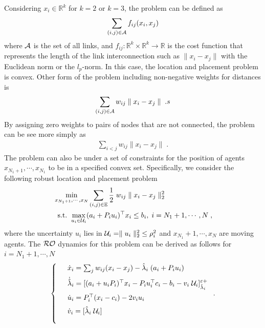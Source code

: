 \documentclass[journal,twoside,web]{ieeecolor}
\begin{document}
Considering $x_i \in \mathbb{R}^k$ for $k=2$ or $k=3$, the problem can be defined as
\begin{align*}
    \sum_{(i,j) \in {\cal A}} f_{ij}(x_i,x_j)
\end{align*}
where ${\cal A}$ is the set of all links, and $f_{ij}:\mathbb{R}^k \times \mathbb{R}^k \rightarrow \mathbb{R}$ is the cost function that represents the length of the link interconnection such as $\parallel x_i-x_j \parallel$ with the Euclidean norm or the $l_p$-norm. In this case, the location and placement problem is convex. Other form of the problem including non-negative weights for distances is
\begin{align*}
    \sum_{(i,j) \in {\cal A}} w_{ij} \parallel x_i - x_j \parallel\;.
s\end{align*}
By assigning zero weights to pairs of nodes that are not connected, the problem can be see more simply as
\begin{align*}
    \sum_{i<j} w_{ij} \parallel x_i - x_j \parallel\;.
\end{align*}
\fi
The problem can also be under a set of constraints for the position of agents $x_{N_1+1},\cdots,x_{N_1}$ to be in a specified convex set. Specifically, we consider the following robust location and placement problem
\begin{align*}
    &\min_{x_{N_1+1},\cdots,x_N} \sum_{(i,j)\in {\mathbb E}} \frac{1}{2}\; w_{ij} \parallel x_i - x_j \parallel_2^2\\
    &\;\;\text{s.t.}\;\;\underset{u_i\in {\cal U}_i}{\max} (a_i+P_i u_i)^\top x_i \leq b_i, \; i={N_1+1},\cdots,N\;,
\end{align*}
where the uncertainty $u_i$ lies in ${\cal U}_i = \parallel u_i \parallel_2^2\; \leq \rho_i^2$ and $x_{N_1}+1,\cdots,x_{N}$ are moving agents. The ${\cal RO}$ dynamics for this problem can be derived as follows for $i=N_1+1,\cdots,N$
\begin{align*}
\left\{
\begin{array}{cl}
\vspace{2mm}
&\dot{x}_i=\sum_j w_{ij} (x_i-x_j)-\hat \lambda_i \; (a_i+P_i u_i)\\
\vspace{2mm}
&\dot{\hat \lambda}_i=[(a_i+u_i P_i)^\top x_i-P_i u_i^\top c_i-b_i-v_i\; {\cal U}_i]_{\hat \lambda_i}^{\varepsilon+}\\
\vspace{2mm}
&\dot{u}_i=P_i^\top (x_i-c_i)-2v_i u_i\\
\vspace{2mm}
&\dot{v}_i=[\hat \lambda_i\; {\cal U}_i]
\vspace{2mm}
\end{array}\right..
\end{align*}
\end{document}
